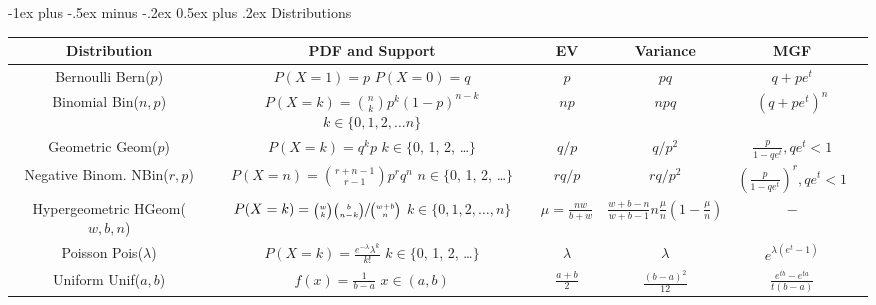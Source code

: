 \documentclass[10pt,landscape]{article}
\makeatletter
\theoremstyle{definition}
\newcommand{\Bern}{\textrm{Bern}}
\newcommand{\Bin}{\textrm{Bin}}
\newcommand{\Pois}{\textrm{Pois}}
\newcommand{\Unif}{\textrm{Unif}}
\newcommand{\Geom}{\textrm{Geom}}
\newcommand{\NBin}{\textrm{NBin}}
\newcommand{\Hypergeometric}{\textrm{HGeom}}
\renewcommand{\section}{\@startsection{section}{1}{0mm}%
                                {-1ex plus -.5ex minus -.2ex}%
                                {0.5ex plus .2ex}%
                                {\normalfont\large\bfseries}}
\makeatother
\begin{document}
\begin{sidewaystable}

    \begin{center}

    \section{Distributions}

    \renewcommand{\arraystretch}{3}
    \begin{tabular}{cccccc}
    \textbf{Distribution} & \textbf{PDF and Support} & \textbf{EV}  & \textbf{Variance} & \textbf{MGF}\\
    \hline \hline
    \shortstack{Bernoulli \\ \Bern($p$)} & \shortstack{$P(X=1) = p$ \\$ P(X=0) = q$} & $p$ & $pq$ & $q + pe^t$ \\
    \hline
    \shortstack{Binomial \\ \Bin($n, p$)} & \shortstack{$P(X=k) = {n \choose k}p^k(1-p)^{n-k}$  \\ $k \in \{0, 1, 2, \dots n\}$}& $np$ & $npq$ & $(q + pe^t)^n$ \\
    \hline
    \shortstack{Geometric \\ \Geom($p$)} & \shortstack{$P(X=k) = q^kp$  \\ $k \in \{$0, 1, 2, \dots $\}$}& $q/p$ & $q/p^2$ & $\frac{p}{1-qe^t}, qe^t < 1$\\
    \hline
    \shortstack{Negative Binom. \\ \NBin($r, p$)} & \shortstack{$P(X=n) = {r + n - 1 \choose r -1}p^rq^n$ \\ $n \in \{$0, 1, 2, \dots $\}$} & $rq/p$ & $rq/p^2$ &  $(\frac{p}{1-qe^t})^r, qe^t < 1$\\
    \hline
    \shortstack{Hypergeometric \\ \Hypergeometric($w, b, n$)} & \shortstack{$P(X=k) = \sfrac{{w \choose k}{b \choose n-k}}{{w + b \choose n}}$ \\ $k \in \{0, 1, 2, \dots,  n\}$} & $\mu = \frac{nw}{b+w}$ &$\frac{w+b-n}{w+b-1}n\frac{\mu}{n}(1 - \frac{\mu}{n})$& $-$  \\
    \hline
    \shortstack{Poisson \\ \Pois($\lambda$)} & \shortstack{$P(X=k) = \frac{e^{-\lambda}\lambda^k}{k!}$ \\ $k \in \{$0, 1, 2, \dots $\}$} & $\lambda$ & $\lambda$ & $e^{\lambda(e^t-1)}$ \\
    \hline
    \hline
    \shortstack{Uniform \\ \Unif($a, b$)} & \shortstack{$ f(x) = \frac{1}{b-a}$ \\$ x \in (a, b) $} & $\frac{a+b}{2}$ & $\frac{(b-a)^2}{12}$ &  $\frac{e^{tb}-e^{ta}}{t(b-a)}$\\

\end{tabular}
\end{center}
\end{sidewaystable}
\end{document}
